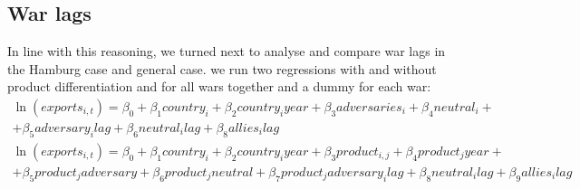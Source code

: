 \documentclass[12pt,a4paper,notitlepage,english]{article}
\begin{document}
\fi

\iffalse
\subsection{War lags}
In line with this reasoning, we turned next to analyse and compare war lags in the Hamburg case and general case. we run two regressions with and without product differentiation and for all wars together and a dummy for each war: 
\begin{multline}
\ln(exports_{i,t})=\beta_0+\beta_1country_i+\beta_2country_iyear+\beta_3adversaries_i+\beta_4neutral_i+\\+\beta_5adversary_ilag+\beta_6neutral_ilag+\beta_8allies_ilag
\end{multline}
\begin{multline}
\ln(exports_{i,t})=\beta_0+\beta_1country_i+\beta_2country_iyear+\beta_3product_{i,j}+\beta_4product_jyear+\\+\beta_5product_jadversary+ \beta_6product_jneutral+\beta_7product_jadversary_ilag+\beta_8neutral_ilag+\beta_9allies_ilag
\end{multline}
\end{document}
